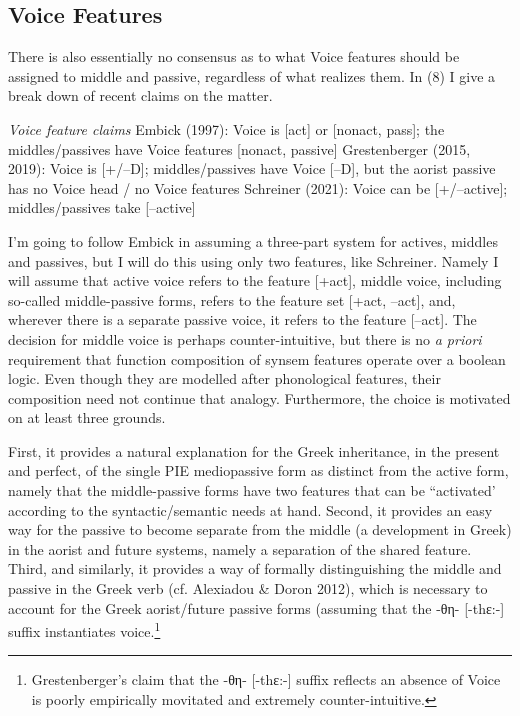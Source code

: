 \documentclass[]{ling-200b-2}
\begin{document}
\normalsize
\subsection{Voice Features}
   
There is also essentially no consensus as to what Voice features should be assigned to middle and passive, regardless of what realizes them. In (8) I give a break down of recent claims on the matter.

\noindent \hfill \par
\pex \textit{Voice feature claims}
\a Embick (1997): Voice is [act] or [nonact, pass]; the middles/passives have Voice features [nonact, passive]
\a Grestenberger (2015, 2019): Voice is [+/--D]; middles/passives have Voice [--D], but the aorist passive has no Voice head / no Voice features
\a Schreiner (2021): Voice can be [+/--active]; middles/passives take [--active]
\xe

\noindent \hfill \par
I'm going to follow Embick in assuming a three-part system for actives, middles and passives, but I will do this using only two features, like Schreiner. Namely I will assume that active voice refers to the feature [+act], middle voice, including so-called middle-passive forms, refers to the feature set [+act, --act], and, wherever there is a separate passive voice, it refers to the feature [--act]. The decision for middle voice is perhaps counter-intuitive, but there is no \textit{a priori} requirement that function composition of synsem features operate over a boolean logic. Even though they are modelled after phonological features, their composition need not continue that analogy. Furthermore, the choice is motivated on at least three grounds. 

First, it provides a natural explanation for the Greek inheritance, in the present and perfect, of the single PIE mediopassive form as distinct from the active form, namely that the middle-passive forms have two features that can be ``activated' according to the syntactic/semantic needs at hand. Second, it provides an easy way for the passive to become separate from the middle (a development in Greek) in the aorist and future systems, namely a separation of the shared feature. Third, and similarly, it provides a way of formally distinguishing the middle and passive in the Greek verb (cf. Alexiadou \& Doron 2012), which is necessary to account for the Greek aorist/future passive forms (assuming that the -θη- [-t\super hε:-] suffix instantiates voice.\footnote{Grestenberger's claim that the -θη- [-t\super hε:-] suffix reflects an absence of Voice is poorly empirically movitated and extremely counter-intuitive.}
\end{document}
